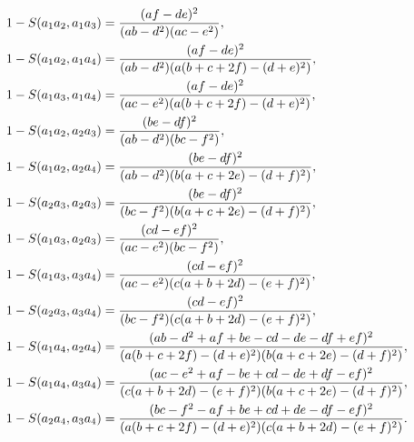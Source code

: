 \documentclass[11pt]{article}
\begin{document}
\begin{align*}
1-S(a_{1}a_{2},a_{1}a_{3})& =\frac{(af-de)^{2}}{(ab-d^{2})(ac-e^{2})}, \\
1-S(a_{1}a_{2},a_{1}a_{4})& =\frac{(af-de)^{2}}{%
(ab-d^{2})(a(b+c+2f)-(d+e)^{2})}, \\
1-S(a_{1}a_{3},a_{1}a_{4})& =\frac{(af-de)^{2}}{%
(ac-e^{2})(a(b+c+2f)-(d+e)^{2})}, \\
1-S(a_{1}a_{2},a_{2}a_{3})& =\frac{(be-df)^{2}}{(ab-d^{2})(bc-f^{2})}, \\
1-S(a_{1}a_{2},a_{2}a_{4})& =\frac{(be-df)^{2}}{%
(ab-d^{2})(b(a+c+2e)-(d+f)^{2})}, \\
1-S(a_{2}a_{3},a_{2}a_{3})& =\frac{(be-df)^{2}}{%
(bc-f^{2})(b(a+c+2e)-(d+f)^{2})}, \\
1-S(a_{1}a_{3},a_{2}a_{3})& =\frac{(cd-ef)^{2}}{(ac-e^{2})(bc-f^{2})}, \\
1-S(a_{1}a_{3},a_{3}a_{4})& =\frac{(cd-ef)^{2}}{%
(ac-e^{2})(c(a+b+2d)-(e+f)^{2})}, \\
1-S(a_{2}a_{3},a_{3}a_{4})& =\frac{(cd-ef)^{2}}{%
(bc-f^{2})(c(a+b+2d)-(e+f)^{2})}, \\
1-S(a_{1}a_{4},a_{2}a_{4})& =\frac{(ab-d^{2}+af+be-cd-de-df+ef)^{2}}{%
(a(b+c+2f)-(d+e)^{2})(b(a+c+2e)-(d+f)^{2})}, \\
1-S(a_{1}a_{4},a_{3}a_{4})& =\frac{(ac-e^{2}+af-be+cd-de+df-ef)^{2}}{%
(c(a+b+2d)-(e+f)^{2})(b(a+c+2e)-(d+f)^{2})}, \\
1-S(a_{2}a_{4},a_{3}a_{4})& =\frac{(bc-f^{2}-af+be+cd+de-df-ef)^{2}}{%
(a(b+c+2f)-(d+e)^{2})(c(a+b+2d)-(e+f)^{2})}.
\end{align*}
\end{document}
